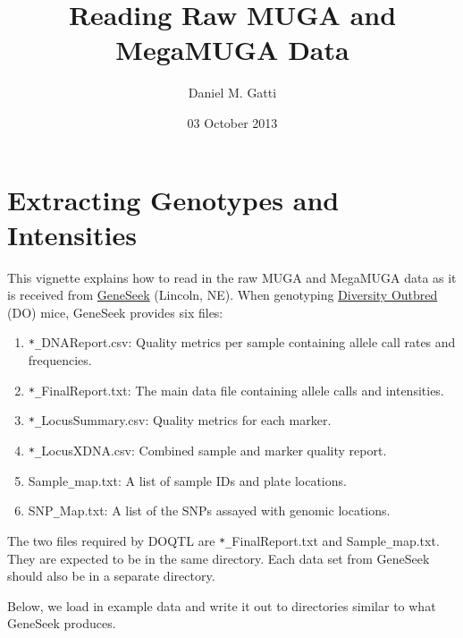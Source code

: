 \documentclass{article}
\begin{document}


\title{Reading Raw MUGA and MegaMUGA Data}
\author{Daniel M. Gatti}
\date{03 October 2013}
\maketitle

\section{Extracting Genotypes and Intensities}

This vignette explains how to read in the raw MUGA and MegaMUGA data as it is received from \href{http://www.neogen.com/Agrigenomics/ResearchDevelop.html}{GeneSeek} (Lincoln, NE). When genotyping \href{http://jaxmice.jax.org/strain/009376.html}{Diversity Outbred} (DO) mice, GeneSeek provides six files:

\begin{enumerate}
  \item{\verb|*_|DNAReport.csv: Quality metrics per sample containing allele call rates and frequencies.}
  \item{\verb|*_|FinalReport.txt: The main data file containing allele calls and intensities.}
  \item{\verb|*_|LocusSummary.csv: Quality metrics for each marker.}
  \item{\verb|*_|LocusXDNA.csv: Combined sample and marker quality report.}
  \item{Sample\verb|_|map.txt: A list of sample IDs and plate locations.}
  \item{SNP\verb|_|Map.txt: A list of the SNPs assayed with genomic locations.}
\end{enumerate}

The two files required by DOQTL are \verb|*_|FinalReport.txt and Sample\verb|_|map.txt. They are expected to be in the same directory. Each data set from GeneSeek should also be in a separate directory. 

\vspace{5 mm}

Below, we load in example data and write it out to directories similar to what GeneSeek produces.
\end{document}
